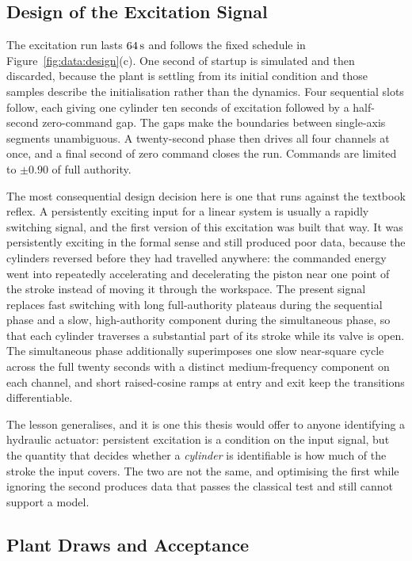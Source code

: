\subsection{Design of the Excitation Signal}

The excitation run lasts $\unit[64]{s}$ and follows the fixed schedule
in Figure~\ref{fig:data:design}(c). One second of startup is simulated
and then discarded, because the plant is settling from its initial
condition and those samples describe the initialisation rather than the
dynamics. Four sequential slots follow, each giving one cylinder ten
seconds of excitation followed by a half-second zero-command gap. The
gaps make the boundaries between single-axis segments unambiguous. A
twenty-second phase then drives all four channels at once, and a final
second of zero command closes the run. Commands are limited to
$\pm 0.90$ of full authority.

The most consequential design decision here is one that runs against the
textbook reflex. A persistently exciting input for a linear system is
usually a rapidly switching signal, and the first version of this
excitation was built that way. It was persistently exciting in the
formal sense and still produced poor data, because the cylinders
reversed before they had travelled anywhere: the commanded energy went
into repeatedly accelerating and decelerating the piston near one point
of the stroke instead of moving it through the workspace. The present
signal replaces fast switching with long full-authority plateaus during
the sequential phase and a slow, high-authority component during the
simultaneous phase, so that each cylinder traverses a
substantial part of its stroke while its valve is open. The simultaneous
phase additionally superimposes one slow near-square cycle across the
full twenty seconds with a distinct medium-frequency component on each
channel, and short raised-cosine ramps at entry and exit keep the
transitions differentiable.

The lesson generalises, and it is one this thesis would offer to anyone
identifying a hydraulic actuator: persistent excitation is a condition
on the input signal, but the quantity that decides whether a
\emph{cylinder} is identifiable is how much of the stroke the input covers. The two are not the same, and optimising the first
while ignoring the second produces data that passes the classical test
and still cannot support a model.

\subsection{Plant Draws and Acceptance}


